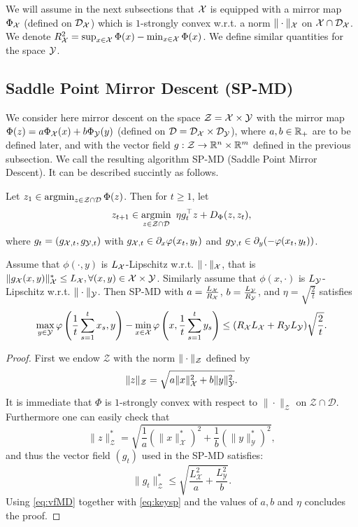 We will assume in the next subsections that $\mathcal{X}$ is equipped with a mirror map $\Phi_{\mathcal{X}}$ (defined on $\mathcal{D}_{\mathcal{X}}$) which is $1$-strongly convex w.r.t. a norm $\|\cdot\|_{\mathcal{X}}$ on $\mathcal{X} \cap \mathcal{D}_{\mathcal{X}}$. We denote $R^2_{\mathcal{X}} = \sup_{x \in \mathcal{X}} \Phi(x) - \min_{x \in \mathcal{X}} \Phi(x)$. We define similar quantities for the space $\mathcal{Y}$.

\subsection{Saddle Point Mirror Descent (SP-MD)} \label{sec:spmd}
We consider here mirror descent on the space $\mathcal{Z} = \mathcal{X} \times \mathcal{Y}$ with the mirror map $\Phi(z) = a \Phi_{\mathcal{X}}(x) + b \Phi_{\mathcal{Y}}(y)$ (defined on $\mathcal{D} = \mathcal{D}_{\mathcal{X}} \times \mathcal{D}_{\mathcal{Y}}$), where $a, b \in \mathbb{R}_+$ are to be defined later, and with the vector field $g : \mathcal{Z} \rightarrow \mathbb{R}^n \times \mathbb{R}^m$ defined in the previous subsection. We call the resulting algorithm SP-MD (Saddle Point Mirror Descent). It can be described succintly as follows.

Let $z_1 \in \mathop{\mathrm{argmin}}_{z \in \mathcal{Z} \cap \mathcal{D}} \Phi(z)$. Then for $t \geq 1$, let
$$z_{t+1} \in \mathop{\mathrm{argmin}}_{z \in \mathcal{Z} \cap \mathcal{D}} \ \eta g_t^{\top} z + D_{\Phi}(z,z_t) ,$$
where $g_t = (g_{\mathcal{X},t}, g_{\mathcal{Y},t})$ with $g_{\mathcal{X},t} \in \partial_x \varphi(x_t,y_t)$ and $g_{\mathcal{Y},t} \in \partial_y (- \varphi(x_t,y_t))$.

\begin{theorem} \label{th:spmd}
Assume that $\phi(\cdot, y)$ is $L_{\mathcal{X}}$-Lipschitz w.r.t. $\|\cdot\|_{\mathcal{X}}$, that is $\|g_{\mathcal{X}}(x,y)\|_{\mathcal{X}}^* \leq L_{\mathcal{X}}, \forall (x, y) \in \mathcal{X} \times \mathcal{Y}$. Similarly assume that $\phi(x, \cdot)$ is $L_{\mathcal{Y}}$-Lipschitz w.r.t. $\|\cdot\|_{\mathcal{Y}}$. Then SP-MD with $a= \frac{L_{\mathcal{X}}}{R_{\mathcal{X}}}$, $b=\frac{L_{\mathcal{Y}}}{R_{\mathcal{Y}}}$, and $\eta=\sqrt{\frac{2}{t}}$ satisfies
$$\max_{y \in \mathcal{Y}} \varphi\left( \frac1{t} \sum_{s=1}^t x_s,y \right) - \min_{x \in \mathcal{X}} \varphi\left(x, \frac1{t} \sum_{s=1}^t y_s \right) \leq (R_{\mathcal{X}} L_{\mathcal{X}} + R_{\mathcal{Y}} L_{\mathcal{Y}}) \sqrt{\frac{2}{t}}.$$
\end{theorem}

\begin{proof}
First we endow $\mathcal{Z}$ with the norm $\|\cdot\|_{\mathcal{Z}}$ defined by
$$\|z\|_{\mathcal{Z}} = \sqrt{a \|x\|_{\mathcal{X}}^2 + b \|y\|_{\mathcal{Y}}^2} .$$
It is immediate that $\Phi$ is $1$-strongly convex with respect to $\|\cdot\|_{\mathcal{Z}}$ on $\mathcal{Z} \cap \mathcal{D}$. Furthermore one can easily check that
$$\|z\|_{\mathcal{Z}}^* = \sqrt{\frac1{a} \left(\|x\|_{\mathcal{X}}^*\right)^2 + \frac1{b} \left(\|y\|_{\mathcal{Y}}^*\right)^2} ,$$
and thus the vector field $(g_t)$ used in the SP-MD satisfies:
$$\|g_t\|_{\mathcal{Z}}^* \leq \sqrt{\frac{L_{\mathcal{X}}^2}{a} + \frac{L_{\mathcal{Y}}^2}{b}} .$$
Using \eqref{eq:vfMD} together with \eqref{eq:keysp} and the values of $a, b$ and $\eta$ concludes the proof.
\end{proof}

